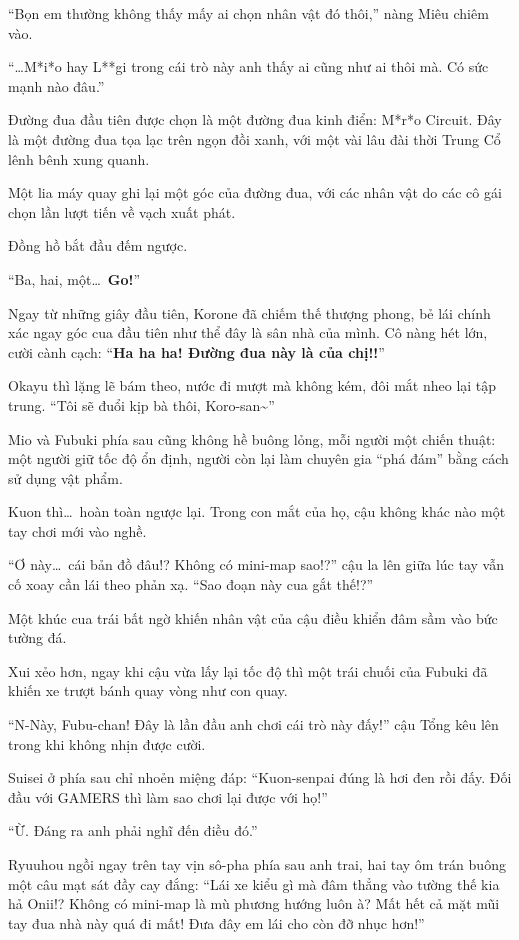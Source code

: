 \documentclass[../main.tex]{subfiles}
\begin{document}
``Bọn em thường không thấy mấy ai chọn nhân vật đó thôi,'' nàng Miêu chiêm vào.

``\dots M*i*o hay L**gi trong cái trò này anh thấy ai cũng như ai thôi mà. Có sức mạnh nào đâu.''

Đường đua đầu tiên được chọn là một đường đua kinh điển: M*r*o Circuit. Đây là một đường đua tọa lạc trên ngọn đồi xanh, với một vài lâu đài thời Trung Cổ lênh bênh xung quanh.

Một lia máy quay ghi lại một góc của đường đua, với các nhân vật do các cô gái chọn lần lượt tiến về vạch xuất phát.

Đồng hồ bắt đầu đếm ngược.

``Ba, hai, một\dots\ \textbf{Go!}''

Ngay từ những giây đầu tiên, Korone đã chiếm thế thượng phong, bẻ lái chính xác ngay góc cua đầu tiên như thể đây là sân nhà của mình.  Cô nàng hét lớn, cười cành cạch: ``\textbf{Ha ha ha! Đường đua này là của chị!!}''

Okayu thì lặng lẽ bám theo, nước đi mượt mà không kém, đôi mắt nheo lại tập trung. ``Tôi sẽ đuổi kịp bà thôi, Koro-san\~{}''

Mio và Fubuki phía sau cũng không hề buông lỏng, mỗi người một chiến thuật: một người giữ tốc độ ổn định, người còn lại làm chuyên gia ``phá đám'' bằng cách sử dụng vật phẩm.

Kuon thì\dots\ hoàn toàn ngược lại. Trong con mắt của họ, cậu không khác nào một tay chơi mới vào nghề.

``Ơ này\dots\ cái bản đồ đâu!? Không có mini-map sao!?'' cậu la lên giữa lúc tay vẫn cố xoay cần lái theo phản xạ. ``Sao đoạn này cua gắt thế!?''

Một khúc cua trái bất ngờ khiến nhân vật của cậu điều khiển đâm sầm vào bức tường đá.

Xui xẻo hơn, ngay khi cậu vừa lấy lại tốc độ thì một trái chuối của Fubuki đã khiến xe trượt bánh quay vòng như con quay.

``N-Này, Fubu-chan! Đây là lần đầu anh chơi cái trò này đấy!'' cậu Tổng kêu lên trong khi không nhịn được cười.

Suisei ở phía sau chỉ nhoẻn miệng đáp: ``Kuon-senpai đúng là hơi đen rồi đấy. Đối đầu với GAMERS thì làm sao chơi lại được với họ!''

``Ừ. Đáng ra anh phải nghĩ đến điều đó.''

Ryuuhou ngồi ngay trên tay vịn sô-pha phía sau anh trai, hai tay ôm trán buông một câu mạt sát đầy cay đắng: ``Lái xe kiểu gì mà đâm thẳng vào tường thế kia hả Onii!? Không có mini-map là mù phương hướng luôn à? Mất hết cả mặt mũi tay đua nhà này quá đi mất! Đưa đây em lái cho còn đỡ nhục hơn!''
\end{document}
